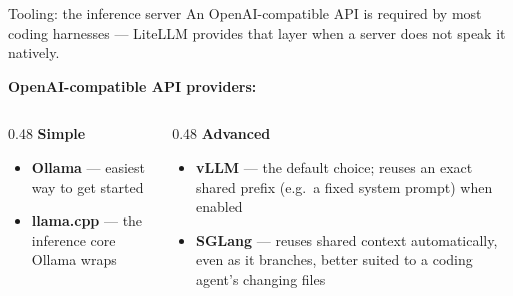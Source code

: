 \documentclass[aspectratio=169,10pt]{beamer}
\begin{document}
\begin{frame}{Tooling: the inference server}
  An OpenAI-compatible API is required by most coding harnesses --- LiteLLM
  provides that layer when a server does not speak it natively.
  \vspace{0.6em}

  \textbf{OpenAI-compatible API providers:}
  \vspace{0.3em}
  \begin{columns}[T]
    \begin{column}{0.48\textwidth}
      \centering\textbf{Simple}\par\vspace{0.4em}
      \begin{itemize}
        \small
        \item \textbf{Ollama} --- easiest way to get started
        \item \textbf{llama.cpp} --- the inference core Ollama wraps
      \end{itemize}
    \end{column}
    \begin{column}{0.48\textwidth}
      \centering\textbf{Advanced}\par\vspace{0.4em}
      \begin{itemize}
        \small
        \item \textbf{vLLM} --- the default choice; reuses an exact shared
          prefix (e.g.\ a fixed system prompt) when enabled
        \item \textbf{SGLang} --- reuses shared context automatically, even
          as it branches, better suited to a coding agent's changing files
      \end{itemize}
    \end{column}
  \end{columns}
\end{frame}
\end{document}
